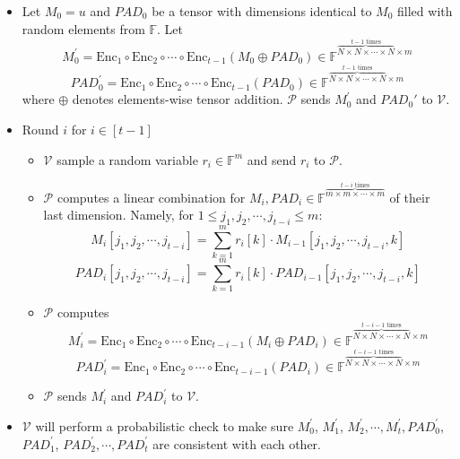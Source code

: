 \begin{itemize}
    \item Let $M_0 = u$ and $PAD_0$ be a tensor with dimensions identical to $M_0$ filled with random elements from $\mathbb{F}$.
Let 
$$
    M_0^{\prime} = \text{Enc}_1 \circ \text{Enc}_2 \circ \cdots \circ \text{Enc}_{t-1} (M_0 \oplus PAD_0) \in \mathbb{F}^{\overbrace{N \times N \times \cdots \times N}^{t-1 \text{ times}} \times m}
$$
$$
    PAD_0^{\prime} = \text{Enc}_1 \circ \text{Enc}_2 \circ \cdots \circ \text{Enc}_{t-1} (PAD_0) \in \mathbb{F}^{\overbrace{N \times N \times \cdots \times N}^{t-1 \text{ times}} \times m}
$$
where $\oplus$ denotes elements-wise tensor addition.
$\mathcal{P}$ sends $M_0^{\prime}$ and $PAD_0\prime$ to $\mathcal{V}$.

    \item Round $i$ for $i \in [t-1]$
    
    \begin{itemize}
        \item $\mathcal{V}$ sample a random variable $r_i \in \mathbb{F}^m$ and send $r_i$ to $\mathcal{P}$.
        \item $\mathcal{P}$ computes a linear combination for $M_i, PAD_i \in \mathbb{F}^{\overbrace{m \times m \times \cdots \times m}^{t-i \text{ times}}}$ of their last dimension.
        Namely, for $1 \le j_1,j_2, \cdots, j_{t-i} \le m$:
$$
    M_i[j_1,j_2, \cdots, j_{t-i}] = \sum_{k=1}^{m} r_{i}[k] \cdot M_{i-1}[j_1,j_2, \cdots, j_{t-i}, k]
$$
$$
    PAD_i[j_1,j_2, \cdots, j_{t-i}] = \sum_{k=1}^{m} r_{i}[k] \cdot PAD_{i-1}[j_1,j_2, \cdots, j_{t-i}, k]
$$
        \item $\mathcal{P}$ computes
$$
M_i^\prime = \text{Enc}_1 \circ \text{Enc}_2 \circ \cdots \circ \text{Enc}_{t - i - 1}(M_i \oplus PAD_i)\in \mathbb{F}^{\overbrace{N \times N \times \cdots \times N}^{t-i-1 \text{ times}} \times m}
$$
$$
PAD_i^\prime = \text{Enc}_1 \circ \text{Enc}_2 \circ \cdots \circ \text{Enc}_{t - i - 1}(PAD_i)\in \mathbb{F}^{\overbrace{N \times N \times \cdots \times N}^{t-i-1 \text{ times}} \times m}
$$
        \item $\mathcal{P}$ sends $M_i^{\prime}$ and $PAD_i^\prime$ to $\mathcal{V}$.
    \end{itemize}
    
    \item $\mathcal{V}$ will perform a probabilistic check to make sure 
$M_0^\prime$, $M_1^\prime$, $M_2^\prime, \cdots, M_{t}^\prime, PAD_0^\prime$, $PAD_1^\prime$, $PAD_2^\prime, \cdots, PAD_{t}^\prime$ are consistent with each other.


\end{itemize}
